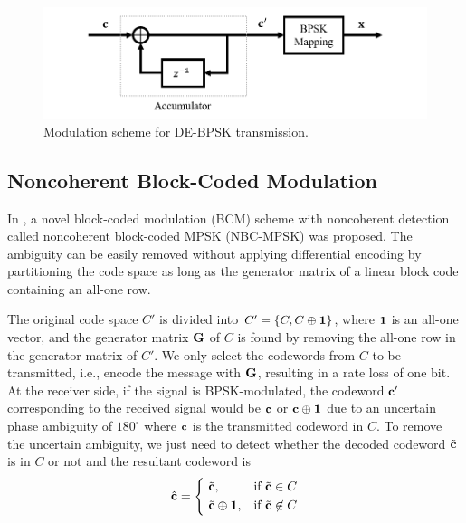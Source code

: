 \begin{figure}[t!]
 \centering
 \includegraphics[width=15cm]{fig/de_bpsk_enc.png}
 \caption{Modulation scheme for DE-BPSK transmission.}
 \label{fig:de_bpsk_enc}
\end{figure}

\subsection{Noncoherent Block-Coded Modulation}

In \cite{nbc05}, a novel block-coded modulation (BCM) scheme with noncoherent detection called noncoherent block-coded MPSK (NBC-MPSK) was proposed. The ambiguity can be easily removed without applying differential encoding by partitioning the code space as long as the generator matrix of a linear block code containing an all-one row.

The original code space $C'$ is divided into $C'=\{C, C \oplus \bf 1\}$, where $\bf 1$ is an all-one vector, and the generator matrix $\bf G$ of $C$ is found by removing the all-one row in the generator matrix of $C'$. We only select the codewords from $C$ to be transmitted, i.e., encode the message with $\bf G$, resulting in a rate loss of one bit. At the receiver side, if the signal is BPSK-modulated, the codeword $\bf c'$ corresponding to the received signal would be $\bf c$ or ${\bf c} \oplus {\bf 1}$ due to an uncertain phase ambiguity of $180^{\circ}$ where $\bf c$ is the transmitted codeword in $C$. To remove the uncertain ambiguity, we just need to detect whether the decoded codeword $\tilde{\bf c}$ is in $C$ or not and the resultant codeword is
\begin{equation}
 \hat{\bf c} =
  \begin{dcases}
   \ \tilde{\bf c}, & \text{if } \tilde{\bf c} \in C \\
   \ \tilde{\bf c} \oplus {\bf 1}, & \text{if } \tilde{\bf c} \not\in C
  \end{dcases}
\label{equ:space_identification}
\end{equation}

